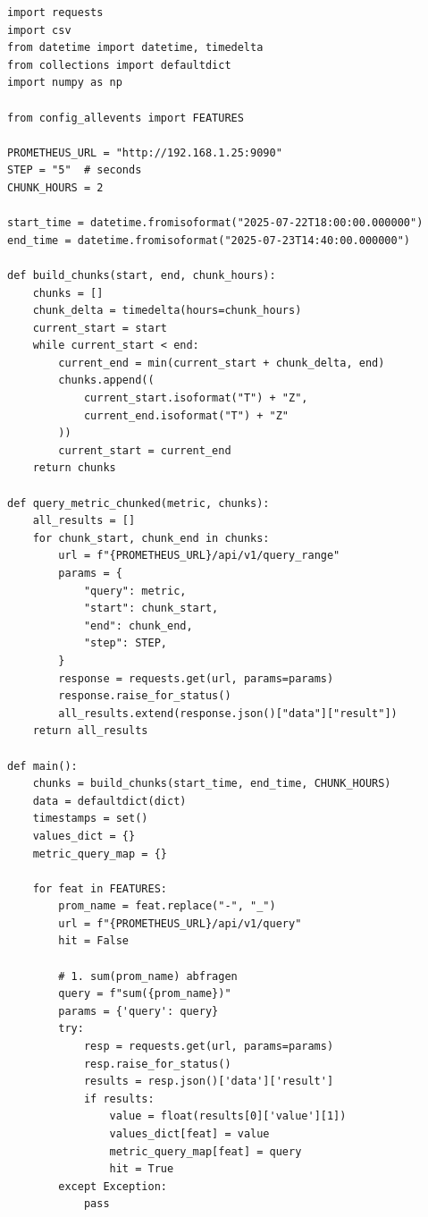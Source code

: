 
\begin{lstlisting}[caption={Python script for scraping performance monitoring from Prometheus into an \texttt{CSV} file}, label={lst:prometheustocsv_scraper}]
import requests
import csv
from datetime import datetime, timedelta
from collections import defaultdict
import numpy as np

from config_allevents import FEATURES

PROMETHEUS_URL = "http://192.168.1.25:9090"
STEP = "5"  # seconds
CHUNK_HOURS = 2

start_time = datetime.fromisoformat("2025-07-22T18:00:00.000000")
end_time = datetime.fromisoformat("2025-07-23T14:40:00.000000")

def build_chunks(start, end, chunk_hours):
    chunks = []
    chunk_delta = timedelta(hours=chunk_hours)
    current_start = start
    while current_start < end:
        current_end = min(current_start + chunk_delta, end)
        chunks.append((
            current_start.isoformat("T") + "Z",
            current_end.isoformat("T") + "Z"
        ))
        current_start = current_end
    return chunks

def query_metric_chunked(metric, chunks):
    all_results = []
    for chunk_start, chunk_end in chunks:
        url = f"{PROMETHEUS_URL}/api/v1/query_range"
        params = {
            "query": metric,
            "start": chunk_start,
            "end": chunk_end,
            "step": STEP,
        }
        response = requests.get(url, params=params)
        response.raise_for_status()
        all_results.extend(response.json()["data"]["result"])
    return all_results

def main():
    chunks = build_chunks(start_time, end_time, CHUNK_HOURS)
    data = defaultdict(dict)
    timestamps = set()
    values_dict = {}
    metric_query_map = {}

    for feat in FEATURES:
        prom_name = feat.replace("-", "_")
        url = f"{PROMETHEUS_URL}/api/v1/query"
        hit = False

        # 1. sum(prom_name) abfragen
        query = f"sum({prom_name})"
        params = {'query': query}
        try:
            resp = requests.get(url, params=params)
            resp.raise_for_status()
            results = resp.json()['data']['result']
            if results:
                value = float(results[0]['value'][1])
                values_dict[feat] = value
                metric_query_map[feat] = query
                hit = True
        except Exception:
            pass


\end{lstlisting}
